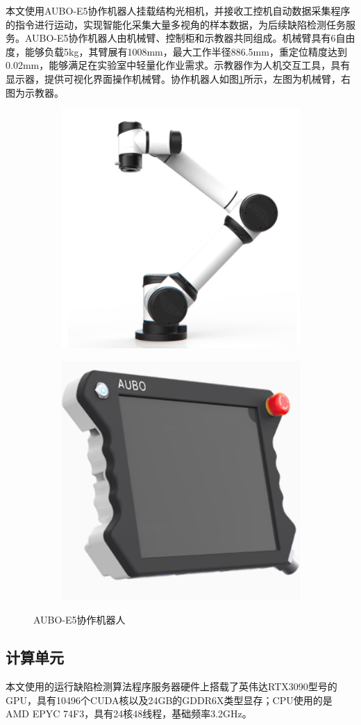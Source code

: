 本文使用AUBO-E5协作机器人挂载结构光相机，并接收工控机自动数据采集程序的指令进行运动，实现智能化采集大量多视角的样本数据，为后续缺陷检测任务服务。AUBO-E5协作机器人由机械臂、控制柜和示教器共同组成。机械臂具有6自由度，能够负载5kg，其臂展有1008mm，最大工作半径886.5mm，重定位精度达到0.02mm，能够满足在实验室中轻量化作业需求。示教器作为人机交互工具，具有显示器，提供可视化界面操作机械臂。协作机器人如图\ref{fig:aubo}所示，左图为机械臂，右图为示教器。
\begin{figure}[htbp]
  \centering
  \begin{subfigure}
      \centering
      \includegraphics[width=.35\linewidth]{figures/2/aubo-1.png}  
    \end{subfigure}
    \begin{subfigure}
      \centering
      \includegraphics[width=.35\linewidth]{figures/2/aubo-2.png} 
    \end{subfigure}
  \caption{AUBO-E5协作机器人}
  \label{fig:aubo}
\end{figure}



\subsection{计算单元}
本文使用的运行缺陷检测算法程序服务器硬件上搭载了英伟达RTX3090型号的GPU，具有10496个CUDA核以及24GB的GDDR6X类型显存；CPU使用的是AMD EPYC 74F3，具有24核48线程，基础频率3.2GHz。


